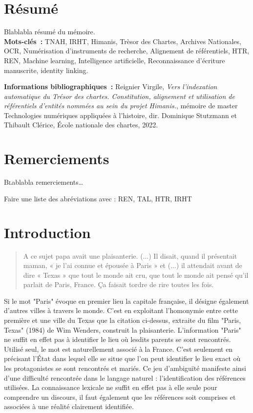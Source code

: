 \documentclass[a4paper,12pt,twoside]{book}
\begin{document}
	\chapter{Résumé}
	\medskip
	Blablabla résumé du mémoire.\\
	
	\textbf{Mots-clés~:} TNAH, IRHT, Himanis, Trèsor des Chartes, Archives Nationales, OCR, Numérisation d'instruments de recherche, Alignement de référentiels, HTR, REN, Machine learning, Intelligence artificielle, Reconnaissance d'écriture manuscrite, identity linking.
	
	\textbf{Informations bibliographiques~:} Reignier Virgile, \textit{Vers l’indexation automatique du Trésor des chartes. Constitution, alignement et utilisation de référentiels d’entités nommées au sein du projet Himanis.}, mémoire de master \og{}Technologies numériques appliquées à l'histoire\fg{}, dir. Dominique Stutzmann et Thibault Clérice, École nationale des chartes, 2022.
	
	\chapter{Remerciements}
	
	\lettrine{B}lablabla remerciements\dots
	
		Faire une liste des abréviations avec : REN, TAL, HTR, IRHT
	
	\printbibliography
	
	\chapter{Introduction}
	
	\begin{quotation}
		
	A ce sujet papa avait une plaisanterie. (...) Il disait, quand il présentait maman, « je l’ai connue et épousée à Paris » et (...) il attendait avant de dire « Texas » que tout le monde ait cru, que tout le monde ait pensé qu’il parlait de Paris, France. Ça faisait tordre de rire toutes les fois.
	
	\end{quotation}
	\bigbreak
	
	
	Si le mot "Paris" évoque en premier lieu la capitale française, il désigne également d'autres villes à travers le monde. C'est en exploitant l'homonymie entre cette première et une ville du Texas que la citation ci-dessus, extraite du film "Paris, Texas" (1984) de Wim Wenders, construit la plaisanterie. L'information "Paris" ne suffit en effet pas à identifier le lieu où lesdits parents se sont rencontrés. Utilisé seul, le mot est naturellement associé à la France. C'est seulement en précisant l'État dans lequel elle se situe que l'on peut identifier le lieu exact où les protagonistes se sont rencontrés et mariés. Ce jeu d'ambiguïté manifeste ainsi d'une difficulté rencontrée dans le langage naturel : l'identification des références utilisées. La connaissance lexicale ne suffit en effet pas à elle seule pour comprendre un discours, il faut également que les références soit comprises et associées à une réalité clairement identifiée.
	
\end{document}
